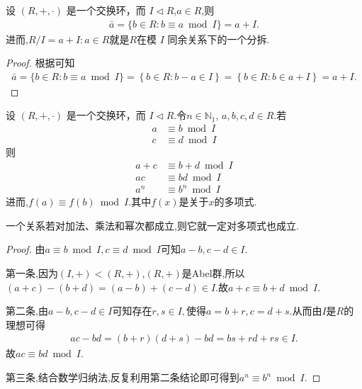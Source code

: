 \documentclass[../../main.tex]{subfiles}
\begin{document}
\begin{proposition}
设 $(R, +, \cdot)$ 是一个交换环，而 $I \lhd R$,$a\in R$,则
\begin{align*}
\bar{a}=\{b\in R:b\equiv a \bmod I\}=a+I.
\end{align*}
进而,$R/I={a+I:a\in R}$就是$R$在模 $I$ 同余关系下的一个分拆.
\end{proposition}
\begin{proof}
根据可知
\begin{align*}
\bar{a}=\{b\in R:b\equiv a \bmod I\}=\left\{ b\in R:b-a\in I \right\} =\left\{ b\in R:b\in a+I \right\} =a+I.
\end{align*}
\end{proof}


\begin{proposition}[模理想同余的基本性质]\label{proposition:模理想同余的基本性质}
设 $(R, +, \cdot)$ 是一个交换环，而 $I \lhd R$.令$n \in \mathbb{N}_1$, $a, b, c, d \in R$.若
\begin{align*}
a &\equiv b \bmod I\\
c &\equiv d \bmod I
\end{align*}
则
\begin{align*}
a + c &\equiv b + d \bmod I\\
ac &\equiv bd \bmod I\\
a^n &\equiv b^n \bmod I
\end{align*}
进而,$f(a)\equiv f(b) \bmod I.$其中$f(x)$是关于$x$的多项式.
\end{proposition}
\begin{remark}
一个关系若对加法、乘法和幂次都成立,则它就一定对多项式也成立.
\end{remark}
\begin{proof}
由$a \equiv b \bmod I,c \equiv d \bmod I$可知$a-b,c-d\in I.$

第一条,因为$(I,+)<(R,+)$,$(R,+)$是Abel群,所以$(a+c)-(b+d)=(a-b)+(c-d)\in I.$故$a + c \equiv b + d \bmod I.$

第二条,由$a-b,c-d\in I$可知存在$r,s\in I,$使得$a=b+r,c=d+s$.从而由$I$是$R$的理想可得
\begin{align*}
ac-bd=(b+r)(d+s)-bd=bs+rd+rs\in I.
\end{align*}
故$ac \equiv bd \bmod I.$

第三条,结合数学归纳法,反复利用第二条结论即可得到$a^n \equiv b^n \bmod I$.
\end{proof}
\end{document}
